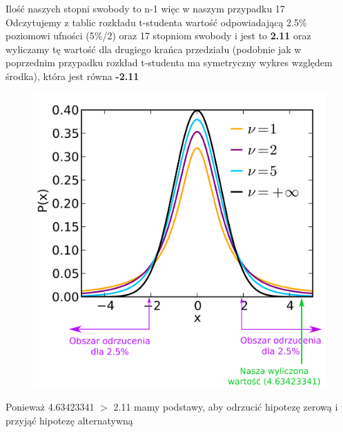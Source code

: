 \documentclass[12pt]{article}
\begin{document}
    Ilość naszych stopni swobody to n-1 więc w naszym przypadku 17 \\

    Odczytujemy z tablic rozkładu t-studenta wartość odpowiadającą 2.5\% poziomowi ufności (5\%/2) oraz 17 stopniom swobody i jest to \textbf{\color[HTML]{b30eff}2.11} oraz wyliczamy tę wartość dla drugiego krańca przedziału (podobnie jak w poprzednim przypadku rozkład t-studenta ma symetryczny wykres względem środka), która jest równa \textbf{\color[HTML]{b30eff}-2.11} \\

    \begin{figure}[H]
        \center
        \includegraphics[width=0.7\linewidth]{t-test.png}
    \end{figure}

    Ponieważ 4.63423341 $>$ 2.11 mamy podstawy, aby odrzucić hipotezę zerową i przyjąć hipotezę alternatywną
\end{document}
